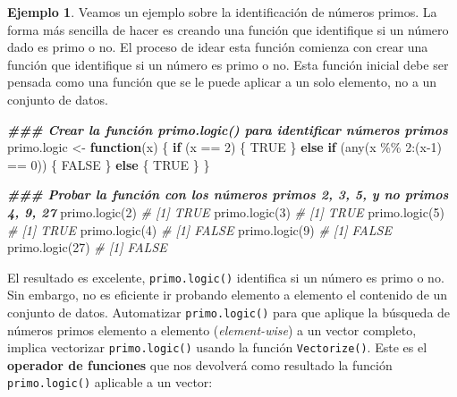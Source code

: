 \documentclass[
]{article}
\newenvironment{Shaded}{\begin{snugshade}}{\end{snugshade}}
\newcommand{\CommentTok}[1]{\textcolor[rgb]{0.56,0.35,0.01}{\textit{#1}}}
\newcommand{\ConstantTok}[1]{\textcolor[rgb]{0.00,0.00,0.00}{#1}}
\newcommand{\ControlFlowTok}[1]{\textcolor[rgb]{0.13,0.29,0.53}{\textbf{#1}}}
\newcommand{\DecValTok}[1]{\textcolor[rgb]{0.00,0.00,0.81}{#1}}
\newcommand{\DocumentationTok}[1]{\textcolor[rgb]{0.56,0.35,0.01}{\textbf{\textit{#1}}}}
\newcommand{\FunctionTok}[1]{\textcolor[rgb]{0.00,0.00,0.00}{#1}}
\newcommand{\NormalTok}[1]{#1}
\newcommand{\OtherTok}[1]{\textcolor[rgb]{0.56,0.35,0.01}{#1}}
\newcommand{\SpecialCharTok}[1]{\textcolor[rgb]{0.00,0.00,0.00}{#1}}
\theoremstyle{definition}
\theoremstyle{definition}
\newtheorem{example}{Ejemplo}[section]
\theoremstyle{definition}
\theoremstyle{definition}
\theoremstyle{remark}
\begin{document}
\begin{example}

Veamos un ejemplo sobre la identificación de números primos. La forma más sencilla de hacer es creando una función que identifique si un número dado es primo o no. El proceso de idear esta función comienza con crear una función que identifique si un número es primo o no. Esta función inicial debe ser pensada como una función que se le puede aplicar a un solo elemento, no a un conjunto de datos.

\begin{Shaded}
\begin{Highlighting}[]
\DocumentationTok{\#\#\# Crear la función primo.logic() para identificar números primos}
\NormalTok{primo.logic }\OtherTok{\textless{}{-}} \ControlFlowTok{function}\NormalTok{(x) \{}
  \ControlFlowTok{if}\NormalTok{ (x }\SpecialCharTok{==} \DecValTok{2}\NormalTok{) \{}
    \ConstantTok{TRUE}
\NormalTok{  \} }\ControlFlowTok{else} \ControlFlowTok{if}\NormalTok{ (}\FunctionTok{any}\NormalTok{(x }\SpecialCharTok{\%\%} \DecValTok{2}\SpecialCharTok{:}\NormalTok{(x}\DecValTok{{-}1}\NormalTok{) }\SpecialCharTok{==} \DecValTok{0}\NormalTok{)) \{}
    \ConstantTok{FALSE}
\NormalTok{  \} }\ControlFlowTok{else}\NormalTok{ \{ }
    \ConstantTok{TRUE}
\NormalTok{  \}}
\NormalTok{\}}

\DocumentationTok{\#\#\# Probar la función con los números primos 2, 3, 5, y no primos 4, 9, 27}
\FunctionTok{primo.logic}\NormalTok{(}\DecValTok{2}\NormalTok{)}
\CommentTok{\# [1] TRUE}
\FunctionTok{primo.logic}\NormalTok{(}\DecValTok{3}\NormalTok{)}
\CommentTok{\# [1] TRUE}
\FunctionTok{primo.logic}\NormalTok{(}\DecValTok{5}\NormalTok{)}
\CommentTok{\# [1] TRUE}
\FunctionTok{primo.logic}\NormalTok{(}\DecValTok{4}\NormalTok{)}
\CommentTok{\# [1] FALSE}
\FunctionTok{primo.logic}\NormalTok{(}\DecValTok{9}\NormalTok{)}
\CommentTok{\# [1] FALSE}
\FunctionTok{primo.logic}\NormalTok{(}\DecValTok{27}\NormalTok{)}
\CommentTok{\# [1] FALSE}
\end{Highlighting}
\end{Shaded}

El resultado es excelente, \texttt{primo.logic()} identifica si un número es primo o no. Sin embargo, no es eficiente ir probando elemento a elemento el contenido de un conjunto de datos. Automatizar \texttt{primo.logic()} para que aplique la búsqueda de números primos elemento a elemento (\emph{element-wise}) a un vector completo, implica vectorizar \texttt{primo.logic()} usando la función \texttt{Vectorize()}. Este es el \textbf{operador de funciones} que nos devolverá como resultado la función \texttt{primo.logic()} aplicable a un vector:


\end{example}
\end{document}
